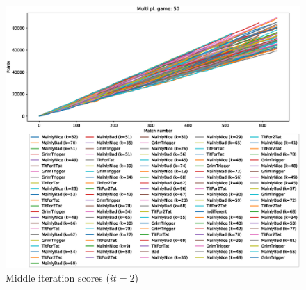 \documentclass[journal,10pt,twoside]{IEEEtran}
\begin{document}
\begin{figure}[!ht]
    \centering
    \includegraphics[width=1\columnwidth]{../img/cipdmp-incr/cipdmp-scores-increasing-pop-50-r2}
    \caption{Middle iteration scores ($it=2$)}
    \label{fig:incrCMI}
\end{figure}
\end{document}
